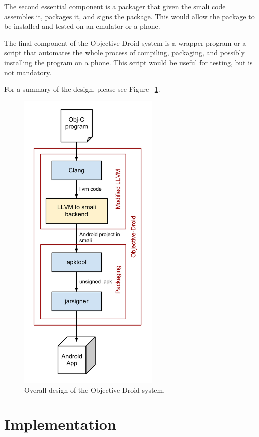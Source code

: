 \documentclass[parskip]{cs4rep}
\begin{document}
The second essential component is a packager that given the smali code assembles it, packages it, and signs the package. This would allow the package to be installed and tested on an emulator or a phone.

The final component of the Objective-Droid system is a wrapper program or a script that automates the whole process of compiling, packaging, and possibly installing the program on a phone. This script would be useful for testing, but is not mandatory.

For a summary of the design, please see Figure ~\ref{fig:design}.

\begin{figure}[htp]
  \label{fig:design}
  \caption{Overall design of the Objective-Droid system.}
  \centering
    \includegraphics[width=0.6\textwidth]{design}
\end{figure}

\section{Implementation}
\end{document}
